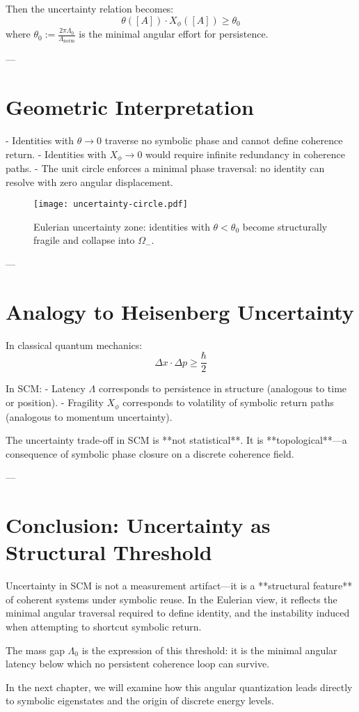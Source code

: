 Then the uncertainty relation becomes:
\[
\theta([A]) \cdot X_\phi([A]) \geq \theta_0
\]
where $\theta_0 := \frac{2\pi \Lambda_0}{\Lambda_{\text{norm}}}$ is the minimal angular effort for persistence.

---

\section{Geometric Interpretation}

- Identities with $\theta \to 0$ traverse no symbolic phase and cannot define coherence return.
- Identities with $X_\phi \to 0$ would require infinite redundancy in coherence paths.
- The unit circle enforces a minimal phase traversal: no identity can resolve with zero angular displacement.

\begin{figure}[h!]
\centering
\texttt{[image: uncertainty-circle.pdf]}
\caption{Eulerian uncertainty zone: identities with $\theta < \theta_0$ become structurally fragile and collapse into $\Omega_-$.}
\end{figure}

---

\section{Analogy to Heisenberg Uncertainty}

In classical quantum mechanics:
\[
\Delta x \cdot \Delta p \geq \frac{\hbar}{2}
\]

In SCM:
- Latency $\Lambda$ corresponds to persistence in structure (analogous to time or position).
- Fragility $X_\phi$ corresponds to volatility of symbolic return paths (analogous to momentum uncertainty).

The uncertainty trade-off in SCM is **not statistical**. It is **topological**—a consequence of symbolic phase closure on a discrete coherence field.

---

\section{Conclusion: Uncertainty as Structural Threshold}

Uncertainty in SCM is not a measurement artifact—it is a **structural feature** of coherent systems under symbolic reuse. In the Eulerian view, it reflects the minimal angular traversal required to define identity, and the instability induced when attempting to shortcut symbolic return.

The mass gap $\Lambda_0$ is the expression of this threshold: it is the minimal angular latency below which no persistent coherence loop can survive.

In the next chapter, we will examine how this angular quantization leads directly to symbolic eigenstates and the origin of discrete energy levels.
